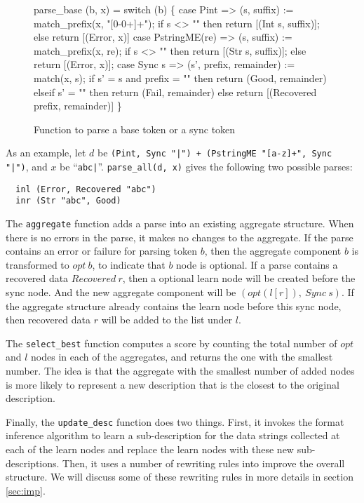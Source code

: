 \begin{figure}[t]
\begin{codebox}
parse_base (b, x) =
  switch (b) \{
  case Pint => 
    (s, suffix) := match_prefix(x, "[0-0+\-]+");
    if s <> "" then return [(Int s, suffix)];
    else return [(Error, x)]
  case PstringME(re) => 
    (s, suffix) := match_prefix(x, re);
    if s <> "" then return [(Str s, suffix)];
    else return [(Error, x)];
  case Sync s => 
    (s', prefix, remainder) := match(x, s);
    if s' = s and prefix = "" then 
      return (Good, remainder)
    elseif s' = "" then 
      return (Fail, remainder)
    else return [(Recovered prefix, remainder)]
  \}
\end{codebox}
\caption{Function to parse a base token or a sync token} \label{fig:parse_base}
\end{figure}

As an example, let $d$ be {\tt (Pint, Sync "|") + (PstringME "[a-z]+", Sync "|")}, 
and $x$ be ``\verb#abc|#''. {\tt parse\_all(d, x)} gives the following two possible parses:
{\small
\begin{verbatim}
  inl (Error, Recovered "abc")
  inr (Str "abc", Good)
\end{verbatim}
}

The {\tt aggregate} function adds a parse into an existing aggregate structure. When there is
no errors in the parse, it makes no changes to the aggregate. If the parse contains 
an error or failure for parsing token $b$, then the aggregate component 
$b$ is transformed to $opt~ b$, to indicate that $b$ node is optional. 
If a parse contains a recovered data $Recovered~ r$, then
a optional learn node will be created before the sync node. And the new aggregate component will be
$(opt (l [r]),~ Sync~ s)$. If the aggregate structure already contains the learn node before this
sync node, then recovered data $r$ will be added to the list under $l$.

The {\tt select\_best} function computes a score by counting the total number of $opt$ and $l$ nodes
in each of the aggregates, and returns the one with the smallest number. The idea is that the
aggregate with the smallest number of added nodes is more likely to represent a new description
that is the closest to the original description. 

Finally, the {\tt update\_desc} function does two things. First, it invokes the format inference
algorithm to learn a sub-description for the data strings collected at each of the learn nodes
and replace the learn nodes with these new sub-descriptions. Then, it uses a number of rewriting
rules into improve the overall structure. We will discuss some of these rewriting rules in more
details in section \ref{sec:imp}.



